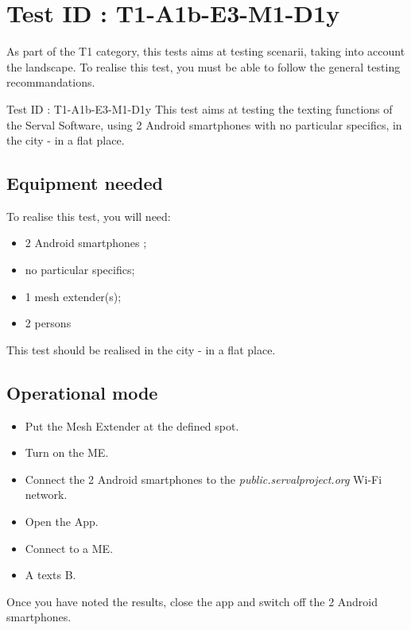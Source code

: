 \documentclass[oneside]{book}
\begin{document}
\section{Test ID : T1-A1b-E3-M1-D1y}
\begin{itshape}
As part of the T1 category, this tests aims at testing scenarii, taking into account the landscape. 
To realise this test, you must be able to follow the general testing recommandations.
\end{itshape}
\newline
Test ID : T1-A1b-E3-M1-D1y
 This test aims at testing the texting functions of the Serval Software, using 2 Android smartphones with no particular specifics, in the city - in a flat place.
\subsection{Equipment needed} To realise this test, you will need:
\begin{itemize}
\item 2 Android smartphones ;
\item no particular specifics;
\item 1 mesh extender(s);
\item 2 persons
\end{itemize}
This test should be realised in the city - in a flat place.
\subsection{Operational mode} \begin{itemize}
\item Put the Mesh Extender at the defined spot.
\item Turn on the ME.
\item Connect the 2 Android smartphones to the \emph{public.servalproject.org} Wi-Fi network.
\item Open the App.
\item Connect to a ME.
\item A texts B.
\end{itemize}
Once you have noted the results, close the app and switch off the 2 Android smartphones.
\end{document}
